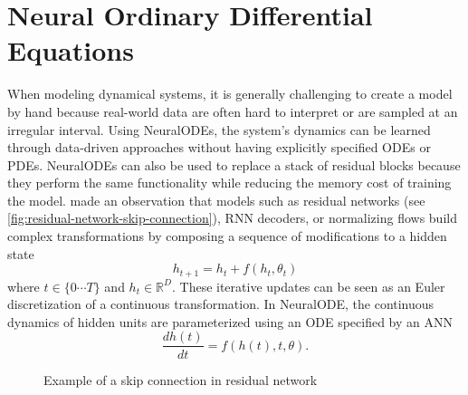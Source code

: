 \section{Neural Ordinary Differential Equations}
\label{sec:literature-review-neural-ordinary-differential-equations}

When modeling dynamical systems, it is generally challenging to create a model by hand because real-world data are often hard to interpret or are sampled at an irregular interval.
Using \glspl{NeuralODE}, the system's dynamics can be learned through data-driven approaches without having explicitly specified \glspl{ODE} or \glspl{PDE}.
\glspl{NeuralODE} can also be used to replace a stack of residual blocks because they perform the same functionality while reducing the memory cost of training the model.
\citeauthor{chenNeuralOrdinaryDifferential2019} made an observation that models such as residual networks (see \autoref{fig:residual-network-skip-connection}), \gls{RNN} decoders, or normalizing flows build complex transformations by composing a sequence of modifications to a hidden state \cite{chenNeuralOrdinaryDifferential2019}
\begin{equation*}
    h_{t+1} = h_t + f(h_t, \theta_t)
\end{equation*}
where $t \in \{0 \cdots T\}$ and $h_t \in \mathbb{R}^D$.
These iterative updates can be seen as an Euler discretization of a continuous transformation.
In \gls{NeuralODE}, the continuous dynamics of hidden units are parameterized using an \gls{ODE} specified by an \gls{ANN}
\begin{equation*}
    \frac{dh(t)}{dt} = f(h(t), t, \theta).
\end{equation*}

\begin{figure}[h]
    \centering
    \caption{Example of a skip connection in residual network}
    \label{fig:residual-network-skip-connection}
\end{figure}

